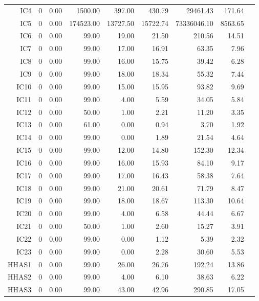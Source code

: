 \begin{longtable}{|rrrrrrrrr|}
	IC4  &  0  &  0.00  &  1500.00  &  397.00  &  430.79  &  29461.43  &  171.64 & \\
	IC5  &  0  &  0.00  &  174523.00  &  13727.50  &  15722.74  &  73336046.10  &  8563.65 & \\
	IC6  &  0  &  0.00  &  99.00  &  19.00  &  21.50  &  210.56  &  14.51 & \\
	IC7  &  0  &  0.00  &  99.00  &  17.00  &  16.91  &  63.35  &  7.96 & \\
	IC8  &  0  &  0.00  &  99.00  &  16.00  &  15.75  &  39.42  &  6.28 & \\
	IC9  &  0  &  0.00  &  99.00  &  18.00  &  18.34  &  55.32  &  7.44 & \\
	IC10  &  0  &  0.00  &  99.00  &  15.00  &  15.95  &  93.82  &  9.69 & \\
	IC11  &  0  &  0.00  &  99.00  &  4.00  &  5.59  &  34.05  &  5.84 & \\
	IC12  &  0  &  0.00  &  50.00  &  1.00  &  2.21  &  11.20  &  3.35 & \\
	IC13  &  0  &  0.00  &  61.00  &  0.00  &  0.94  &  3.70  &  1.92 & \\
	IC14  &  0  &  0.00  &  99.00  &  0.00  &  1.89  &  21.54  &  4.64 & \\
	IC15  &  0  &  0.00  &  99.00  &  12.00  &  14.80  &  152.30  &  12.34 & \\
	IC16  &  0  &  0.00  &  99.00  &  16.00  &  15.93  &  84.10  &  9.17 & \\
	IC17  &  0  &  0.00  &  99.00  &  17.00  &  16.43  &  58.38  &  7.64 & \\
	IC18  &  0  &  0.00  &  99.00  &  21.00  &  20.61  &  71.79  &  8.47 & \\
	IC19  &  0  &  0.00  &  99.00  &  18.00  &  18.67  &  113.30  &  10.64 & \\
	IC20  &  0  &  0.00  &  99.00  &  4.00  &  6.58  &  44.44  &  6.67 & \\
	IC21  &  0  &  0.00  &  50.00  &  1.00  &  2.60  &  15.27  &  3.91 & \\
	IC22  &  0  &  0.00  &  99.00  &  0.00  &  1.12  &  5.39  &  2.32 & \\
	IC23  &  0  &  0.00  &  99.00  &  0.00  &  2.28  &  30.60  &  5.53 & \\
	HHAS1  &  0  &  0.00  &  99.00  &  26.00  &  26.76  &  192.24  &  13.86 & \\
	HHAS2  &  0  &  0.00  &  99.00  &  4.00  &  6.10  &  38.63  &  6.22 & \\
	HHAS3  &  0  &  0.00  &  99.00  &  43.00  &  42.96  &  290.85  &  17.05 & \\

\end{longtable}
